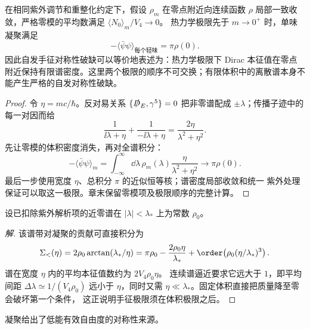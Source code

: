 \begin{theorem}
在相同紫外调节和重整化约定下，假设 $\rho_m$ 在零点附近向连续函数
$\rho$ 局部一致收敛，严格零模的平均数满足 $\langle N_0\rangle_m/V_4\to0$。
热力学极限先于 $m\to0^+$ 时，单味凝聚满足
\begin{equation}
 {
 -\langle\bar\psi\psi\rangle_{\text{每个轻味}}
 =\pi\rho(0).}
 \label{eq:banks-casher-dp11}
\end{equation}
因此自发手征对称性破缺可以等价地表述为：热力学极限下 Dirac 本征值在零点附近保持有限谱密度。这里两个极限的顺序不可交换；有限体积中的离散谱本身不能产生严格的自发对称性破缺。

\end{theorem}
\begin{proof}
令 $\eta=mc/\hbar$。反对易关系 $\{\slashed D_E,\gamma^5\}=0$
把非零谱配成 $\pm\lambda$；传播子迹中的每一对因而给
\begin{equation*}
\frac1{\ii\lambda+\eta}+\frac1{-\ii\lambda+\eta}
=\frac{2\eta}{\lambda^2+\eta^2}.
\end{equation*}
先让零模的体积密度消失，再对全谱积分：
\begin{equation*}
-\langle\bar\psi\psi\rangle_m
=\int_{-\infty}^{\infty}\dd\lambda\,
\rho_m(\lambda)\frac{\eta}{\lambda^2+\eta^2}
\longrightarrow\pi\rho(0).
\end{equation*}
最后一步使用宽度 $\eta$、总积分 $\pi$ 的近似恒等核；谱密度局部收敛和统一
紫外处理保证可以取这一极限。章末保留零模项及极限顺序的完整计算。
\end{proof}

\begin{example}[近零谱的平台与有限体积]
设已扣除紫外解析项的近零谱在 $|\lambda|<\lambda_*$ 上为常数 $\rho_0$。
\end{example}
\begin{proof}[解]
该谱带对凝聚的贡献可直接积分为
\begin{equation*}
\Sigma_{<}(\eta)=2\rho_0\arctan(\lambda_*/\eta)
=\pi\rho_0-\frac{2\rho_0\eta}{\lambda_*}
+\order\!\left(\rho_0(\eta/\lambda_*)^3\right).
\end{equation*}
谱在宽度 $\eta$ 内的平均本征值数约为 $2V_4\rho_0\eta$。
连续谱逼近要求它远大于 $1$，即平均间距
$\Delta\lambda\simeq1/(V_4\rho_0)$ 远小于 $\eta$，同时又需
$\eta\ll\lambda_*$。固定体积直接把质量降至零会破坏第一个条件，
这正说明手征极限须在体积极限之后。
\end{proof}

凝聚给出了低能有效自由度的对称性来源。

